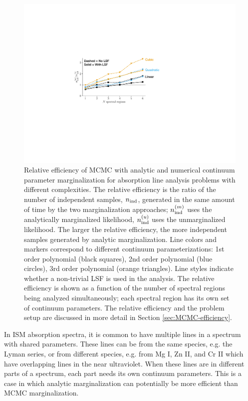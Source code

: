 \documentclass[trackchanges]{aastex62}
\begin{document}
{\begin{figure}
  \includegraphics{efficiency.pdf}
  \caption{
  Relative efficiency of MCMC with analytic and numerical continuum parameter marginalization for absorption line analysis problems with different complexities.
  The relative efficiency is the ratio of the number of independent samples, $n_{\rm ind}$, generated in the same amount of time by the two marginalization approaches; $n_{\rm ind}^{(m)}$ uses the analytically marginalized likelihood, $n_{\rm ind}^{(u)}$ uses the unmarginalized likelihood.
  The larger the relative efficiency, the more independent samples generated by analytic marginalization.
  Line colors and markers correspond to different continuum parameterizations: 1st order polynomial (black squares), 2nd order polynomial (blue circles), 3rd order polynomial (orange triangles).
  Line styles indicate whether a non-trivial LSF is used in the analysis.
  The relative efficiency is shown as a function of the number of spectral regions being analyzed simultaneously; each spectral region has its own set of continuum parameters.
  The relative efficiency and the problem setup are discussed in more detail in Section \ref{sec:MCMC-efficiency}.
  }
  \label{fig:efficiency-comparison}
\end{figure}

In ISM absorption spectra, it is common to have multiple lines in a spectrum with shared parameters.
These lines can be from the same species, e.g. the Lyman series, or from different species, e.g. from Mg {\tiny I}, Zn {\tiny II}, and Cr {\tiny II} which have overlapping lines in the near ultraviolet.
When these lines are in different parts of a spectrum, each part needs its own continuum parameters.
This is a case in which analytic marginalization can potentially be more efficient than MCMC marginalization.

}
\end{document}
